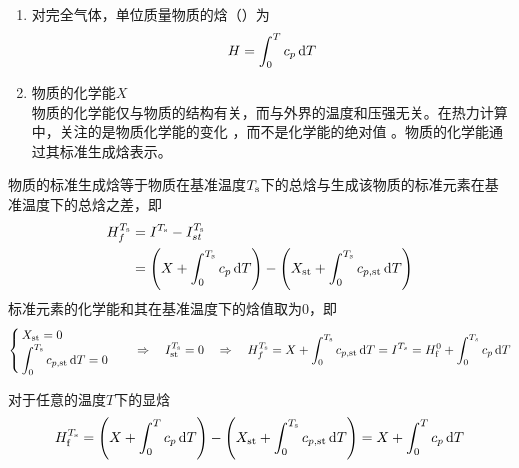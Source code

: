 \begin{enumerate}[\hspace*{2em}(1) ]
	\item 对完全气体，单位质量物质的焓（）为
	\begin{equation}
		H = \int_0^T c_p \, {\rm{d}} T
	\end{equation}
	\item 物质的化学能$X$\\
	\hspace*{2em} 物质的化学能仅与物质的结构有关，而与外界的温度和压强无关。在热力计算中，关注的是物质化学能的变化 ，而不是化学能的绝对值 。物质的化学能通过其标准生成焓表示。
\end{enumerate}



物质的标准生成焓等于物质在基准温度$T_{\text{s}}$下的总焓与生成该物质的标准元素在基准温度下的总焓之差，即
\begin{align*}
	H_f^{T_{\text{s}}}
	& = I^{T_{\text{s}}} - I_{st}^{T_{\text{s}}} \\
	& = \left(X + \int_0^{T_{\text{s}}} c_p \, {\rm{d}} T\right) - \left(X_{\text{st}} + \int_0^{T_{\text{s}}} c_{p,\text{st}}\, {\rm{d}} T\right)
\end{align*}
标准元素的化学能和其在基准温度下的焓值取为0，即
\begin{equation}
	\begin{cases}
		\, X_{\text{st}} = 0\\
		\, \displaystyle \int_0^{T_{\text{s}}} c_{p,\text{st}}\, {\rm{d}} T = 0
	\end{cases}
	\quad \Rightarrow \quad 
	I_{\text{st}}^{T_{\text{s}}} = 0
	\quad \Rightarrow \quad 
	H_f^{T_{\text{s}}} = X + \int_0^{T_{\text{s}}}c_{p, \text{st}}\, {\rm{d}} T = I^{T_s} = H_{\text{f}}^0 + \int_0^{T_s} c_p \, {\rm{d}} T
\end{equation}

对于任意的温度$T$下的显焓
\begin{equation}
	H_{\text{f}}^{T_{\text{s}}} = \left(X + \int_0^{T}c_{p}\, {\rm{d}} T\right) - \left(X_{\text{st}} + \int_0^{T_{\text{s}}}c_{p, \text{st}}\, {\rm{d}} T\right) = X + \int_0^{T}c_{p} \, {\rm{d}} T
\end{equation}


